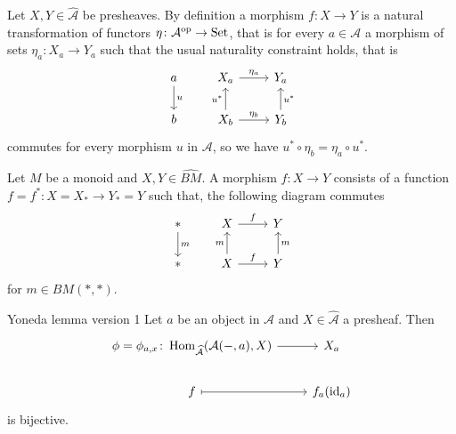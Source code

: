 Let $X,Y \in \widehat{\mathcal{A}}$ be presheaves. 
By definition a morphism $f\colon X \to Y$ is a natural transformation of functors $\eta \colon \mathcal{A}^{\operatorname{op}} \to \operatorname{Set}$, that is for every $a \in \mathcal{A}$ a morphism of sets $\eta_a:X_a \to Y_a$ such that the usual naturality constraint holds, that is 
    \[
    \begin{tikzcd}
        a
        \arrow[d, "u"]
        & 
        X_a
        \arrow[r, "\eta_a"]
        & 
        Y_a
        \\
        b
        &
        X_b
        \arrow[u,"u^*"]
        \arrow[r, "\eta_b"]
        &
        Y_b
        \arrow[u,"u^*"']
    \end{tikzcd}
    \]
commutes for every morphism $u$ in $\mathcal{A}$, so we have $u^* \circ \eta_b = \eta_a \circ u^*$.

\begin{exmp}
    Let $M$ be a monoid and $X,Y \in \widehat{BM}$.
    A morphism $f\colon X \to Y $ consists of a function $f=f^*\colon X =X_* \to Y_*=Y$ such that, the following diagram commutes
    \[
    \begin{tikzcd}
        *
        \arrow[d,"m"]
        &
        X
        \arrow[r,"f"]
        &
        Y
        \\
        *
        &
        X
        \arrow[u,"m"]
        \arrow[r,"f"]
        &
        Y
        \arrow[u,"m"']
    \end{tikzcd}
    \]
    for $m\in BM(*,*)$.
\end{exmp}

\begin{thm}{Yoneda lemma version 1}
\label{yoneda_lemma}
    Let $a$ be an object in $\mathcal{A}$ and $X \in \widehat{\mathcal{A}}$ a presheaf.
    Then 
    \[
    \begin{tikzcd}
       \phi = \phi_{a,x}\colon\Hom_{\widehat{\mathcal{A}}}(\mathcal{A}(-,a),X) 
       \arrow[r]
       &
       X_a 
       \\
       f 
       \arrow[r,mapsto]
       &
       f_a(\id_a)
    \end{tikzcd}
    \]
    is bijective.
\end{thm}

